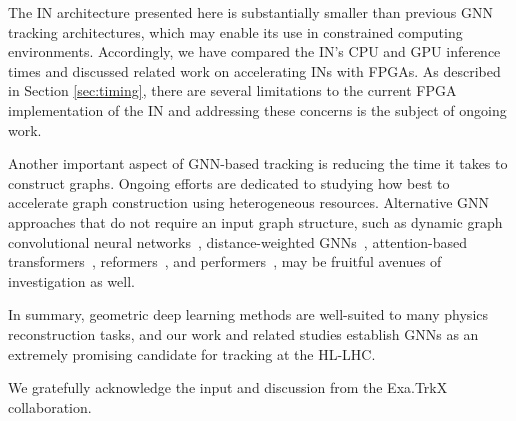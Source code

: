 \documentclass[twocolumn]{svjour3}
\begin{document}
The IN architecture presented here is substantially smaller than previous GNN tracking architectures, which may enable its use in constrained computing environments.
Accordingly, we have compared the IN's CPU and GPU inference times and discussed related work on accelerating INs with FPGAs. 
As described in Section \ref{sec:timing}, there are several limitations to the current FPGA implementation of the IN and addressing these concerns is the subject of ongoing work. 
  


Another important aspect of GNN-based tracking is reducing the time it takes to construct graphs. 
Ongoing efforts are dedicated to studying how best to accelerate graph construction using heterogeneous resources.
Alternative GNN approaches that do not require an input graph structure, such as dynamic graph convolutional neural networks~\cite{DGCNN}, distance-weighted GNNs~\cite{Qasim:2019otl}, attention-based transformers~\cite{vaswani2017attention}, reformers~\cite{kitaev2020reformer}, and performers~\cite{choromanski2021rethinking}, may be fruitful avenues of investigation as well.

In summary, geometric deep learning methods are well-suited to many physics reconstruction tasks, and our work and related studies establish GNNs as an extremely promising candidate for tracking at the HL-LHC. 





\begin{acknowledgements}
We gratefully acknowledge the input and discussion from the Exa.TrkX collaboration.
\end{acknowledgements}



\end{document}
